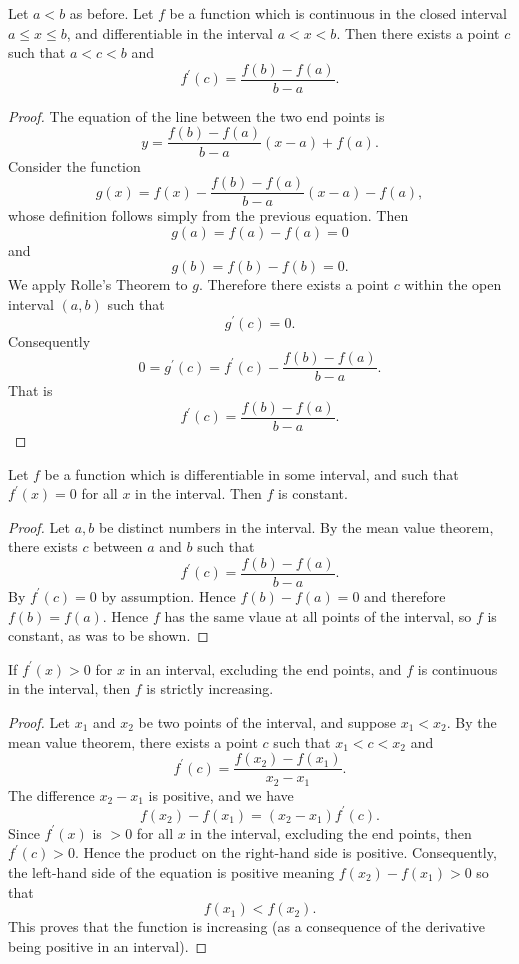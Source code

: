 \begin{theorem} %
  Let $a < b$ as before. Let $f$ be a function which is continuous in the closed interval $a \le x \le b$, and differentiable in the interval $a < x < b$. Then there exists a point $c$ such that $a < c < b$ and
  \[f^\prime(c) = \frac{f(b) - f(a)}{b - a}.\]
\end{theorem}

\begin{proof}
  The equation of the line between the two end points is
  \[y = \frac{f(b) - f(a)}{b - a}(x - a) + f(a).\]
  Consider the function
  \[g(x) = f(x) - \frac{f(b) - f(a)}{b - a}(x - a) - f(a),\]
  whose definition follows simply from the previous equation. Then
  \[g(a) = f(a) - f(a) = 0\]
  and
  \[g(b) = f(b) - f(b) = 0.\]
  We apply Rolle's Theorem to $g$. Therefore there exists a point $c$ within the open interval $(a, b)$ such that
  \[g^\prime(c) = 0.\]
  Consequently
  \[0 = g^\prime(c) = f^\prime(c) - \frac{f(b) - f(a)}{b - a}.\]
  That is
  \[f^\prime(c) = \frac{f(b) - f(a)}{b - a}.\]
\end{proof}

\begin{corollary}
  Let $f$ be a function which is differentiable in some interval, and such that $f^\prime(x) = 0$ for all $x$ in the interval. Then $f$ is constant.
\end{corollary}

\begin{proof}
  Let $a, b$ be distinct numbers in the interval. By the mean value theorem, there exists $c$ between $a$ and $b$ such that
  \[f^\prime(c) = \frac{f(b) - f(a)}{b - a}.\]
  By $f^\prime(c) = 0$ by assumption. Hence $f(b) - f(a) = 0$ and therefore $f(b) = f(a)$. Hence $f$ has the same vlaue at all points of the interval, so $f$ is constant, as was to be shown.
\end{proof}

\begin{corollary}
  If $f^\prime(x) > 0$ for $x$ in an interval, excluding the end points, and $f$ is continuous in the interval, then $f$ is strictly increasing.
\end{corollary}

\begin{proof}
  Let $x_1$ and $x_2$ be two points of the interval, and suppose $x_1 < x_2$. By the mean value theorem, there exists a point $c$ such that $x_1 < c < x_2$ and
  \[f^\prime(c) = \frac{f(x_2) - f(x_1)}{x_2 - x_1}.\]
  The difference $x_2 - x_1$ is positive, and we have
  \[f(x_2) - f(x_1) = (x_2 - x_1) f^\prime(c).\]
  Since $f^\prime(x)$ is $> 0$ for all $x$ in the interval, excluding the end points, then $f^\prime(c) > 0$. Hence the product on the right-hand side is positive. Consequently, the left-hand side of the equation is positive meaning $f(x_2) - f(x_1) > 0$ so that
  \[f(x_1) < f(x_2).\]
  This proves that the function is increasing (as a consequence of the derivative being positive in an interval).
\end{proof}
